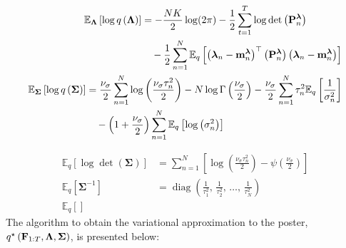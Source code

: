 \begin{align}
\begin{split}
		\mathbb{E}_{\bm \Lambda} \left[ \log q \left( {\bm \Lambda} \right) \right] 
		&= -\frac{NK}{2} \log(2\pi) - \frac{1}{2} \sum_{t=1}^T \log \det \left( {\bf P}^{\bm \lambda}_n \right) \\
		&\hspace{1em}- \frac{1}{2} \sum_{n=1}^N \mathbb{E}_q \left[ \left( {\bm \lambda}_n - {\bf m}_n^{\bm \lambda} \right)^{\top} \left( {\bf P}_n^{\bm \lambda} \right) \left( {\bm \lambda}_n - {\bf m}_n^{\bm \lambda} \right) \right] 
	\end{split} \\
	\begin{split}	
		\mathbb{E}_{\bm \Sigma} \left[ \log q \left( {\bm \Sigma} \right) \right] 
		&= \frac{\nu_{\sigma}}{2} \sum_{n = 1}^N \log \left( \frac{\nu_{\sigma} \tau_n^2}{2} \right) - N \log \Gamma \left( \frac{\nu_{\sigma}}{2} \right) - \frac{\nu_{\sigma}}{2} \sum_{n=1}^N \tau_n^2 \mathbb{E}_q \left[ \frac{1}{\sigma_n^2} \right] \\
		&\hspace{1em} - \left( 1 + \frac{\nu_{\sigma}}{2} \right) \sum_{n=1}^N \mathbb{E}_q \left[ \log \left( \sigma_n^2 \right) \right]
	\end{split}
\end{align}

\begin{align}
	\mathbb{E}_q \left[ \log \det \left( {\bm \Sigma} \right) \right] &= \sum_{n=1}^N \left[ \log \left( \frac{\nu_{\sigma} \tau_n^2}{2} \right) - \psi \left( \frac{\nu_{\sigma}}{2} \right) \right] \\
	\mathbb{E}_q \left[ {\bm \Sigma}^{-1} \right] &= \operatorname{diag} \left( \frac{1}{\tau_1^2},\, \frac{1}{\tau_2^2},\, \ldots,\, \frac{1}{\tau_N^2} \right) \\
	\mathbb{E}_q \left[ \right]
\end{align}
The algorithm to obtain the variational approximation to the poster, $q^{\star} \left( {\bf F}_{1:T}, {\bm \Lambda}, {\bm \Sigma} \right)$, is presented below:

